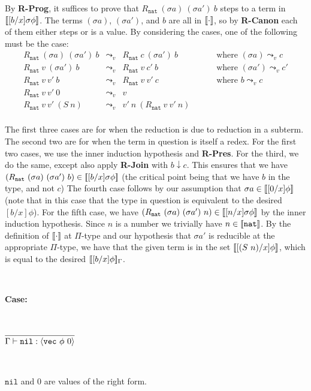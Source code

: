 \documentclass[copyright]{eptcs}
\newcommand{\vc}[0]{\texttt{vec}}
\newcommand{\nat}[0]{\texttt{nat}}
\newcommand{\nil}[0]{\texttt{nil}}
\newcommand{\leadstov}[0]{\leadsto_v}
\newcommand{\interp}[1]{[\negthinspace[#1]\negthinspace]}
\begin{document}
By \textbf{R-Prog}, it suffices to prove that $R_\nat\ (\sigma a)\
(\sigma a')\ b$ steps to a term in $\interp{[b/x]\sigma\phi}$.  The
terms $(\sigma a)$, $(\sigma a')$, and $b$ are all in  $\interp{\cdot}$, 
so by \textbf{R-Canon} each of them either steps or is a value. By
considering the cases, one of the following must be the case:
\[
\begin{array}{llll}
R_\nat\ (\sigma a)\ (\sigma a')\ b & \leadstov & R_\nat\ c\ (\sigma a')\ b &\qquad\text{ where }(\sigma a) \leadstov c \\
R_\nat\ v\ (\sigma a')\ b & \leadstov & R_\nat\ v\ c'\ b &\qquad\text{ where }(\sigma a') \leadstov c' \\
R_\nat\ v\ v'\ b & \leadstov & R_\nat\ v\ v'\ c &\qquad\text{ where } b \leadstov c \\
R_\nat\ v\ v'\ 0 & \leadstov & v \\
R_\nat\ v\ v'\ (S\ n) & \leadstov & v'\ n\ (R_\nat\ v\  v'\  n)\\
\end{array}
\]

\noindent The first three cases are for when the reduction is due to
reduction in a subterm.  The second two are for when the term in
question is itself a redex.  For the first two cases, we use the inner
induction hypothesis and \textbf{R-Pres}.  For the third, we do the
same, except also apply \textbf{R-Join} with $b\downarrow c$.  This
ensures that we have $(R_\nat\ (\sigma a)\ (\sigma a')\ b)\in
\interp{[b/x]\sigma\phi}$ (the critical point being that we have $b$
in the type, and not $c$) The fourth case follows by our assumption
that $\sigma a\in\interp{[0/x]\phi}$ (note that in this case
that the type in question is equivalent to the desired $[b/x]\phi$).
For the fifth case, we have $(R_\nat\ (\sigma a)\ (\sigma a')\
n)\in\interp{[n/x]\sigma\phi}$ by the inner induction
hypothesis. Since $n$ is a number we trivially have $n \in
\interp{\nat}$.  By the definition of $\interp{\cdot}$ at $\Pi$-type
and our hypothesis that $\sigma a'$ is reducible at the appropriate
$\Pi$-type, we have that the given term is in the set $\interp{[(S\
  n)/x]\phi}$, which is equal to the desired
$\interp{[b/x]\phi}_\Gamma$.

\ 

\noindent \textbf{Case:}

\

$\infer{\Gamma\vdash \nil:\langle\vc\ \phi\ 0\rangle}{\ }$

\ 

\noindent $\nil$ and $0$ are values of the right form.
\end{document}
